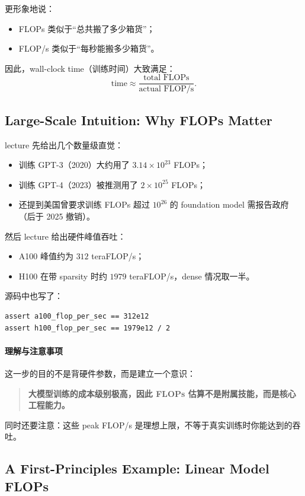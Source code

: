 \documentclass[a4paper,UTF8]{article}
\numberwithin{equation}{section}
\begin{document}
更形象地说：
\begin{itemize}
    \item FLOPs 类似于“总共搬了多少箱货”；
    \item FLOP/s 类似于“每秒能搬多少箱货”。
\end{itemize}

因此，wall-clock time（训练时间）大致满足：
\[
\text{time} \approx \frac{\text{total FLOPs}}{\text{actual FLOP/s}}.
\]

\subsection{Large-Scale Intuition: Why FLOPs Matter}

lecture 先给出几个数量级直觉：
\begin{itemize}
    \item 训练 GPT-3（2020）大约用了 \(3.14 \times 10^{23}\) FLOPs；
    \item 训练 GPT-4（2023）被推测用了 \(2 \times 10^{25}\) FLOPs；
    \item 还提到美国曾要求训练 FLOPs 超过 \(10^{26}\) 的 foundation model 需报告政府（后于 2025 撤销）。
\end{itemize}

然后 lecture 给出硬件峰值吞吐：
\begin{itemize}
    \item A100 峰值约为 \(312\) teraFLOP/s；
    \item H100 在带 sparsity 时约 \(1979\) teraFLOP/s，dense 情况取一半。
\end{itemize}

源码中也写了：
\begin{verbatim}
assert a100_flop_per_sec == 312e12
assert h100_flop_per_sec == 1979e12 / 2
\end{verbatim}

\paragraph{理解与注意事项}
这一步的目的不是背硬件参数，而是建立一个意识：

\begin{quote}
\textbf{大模型训练的成本级别极高，因此 FLOPs 估算不是附属技能，而是核心工程能力。}
\end{quote}

同时还要注意：这些 peak FLOP/s 是理想上限，不等于真实训练时你能达到的吞吐。

\subsection{A First-Principles Example: Linear Model FLOPs}
\end{document}
